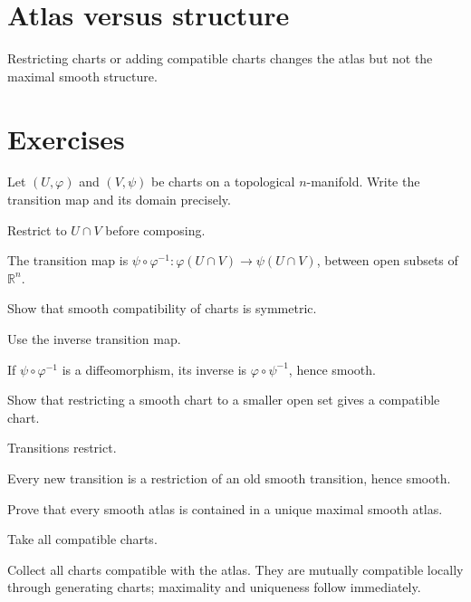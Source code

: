 \section{Atlas versus structure}
\begin{remark}\label{rem:vii02-generators}
Restricting charts or adding compatible charts changes the atlas but not the maximal smooth structure.
\end{remark}
\section{Exercises}
\begin{exercise}\label{exr:vii02-01}
Let \((U,\varphi)\) and \((V,\psi)\) be charts on a topological \(n\)-manifold. Write the transition map and its domain precisely.
\end{exercise}
\begin{hint}
Restrict to \(U\cap V\) before composing.
\end{hint}
\begin{solution}
The transition map is \(\psi\circ\varphi^{-1}:\varphi(U\cap V)\to\psi(U\cap V)\), between open subsets of \(\mathbb R^n\).
\end{solution}

\begin{exercise}\label{exr:vii02-02}
Show that smooth compatibility of charts is symmetric.
\end{exercise}
\begin{hint}
Use the inverse transition map.
\end{hint}
\begin{solution}
If \(\psi\circ\varphi^{-1}\) is a diffeomorphism, its inverse is \(\varphi\circ\psi^{-1}\), hence smooth.
\end{solution}

\begin{exercise}\label{exr:vii02-03}
Show that restricting a smooth chart to a smaller open set gives a compatible chart.
\end{exercise}
\begin{hint}
Transitions restrict.
\end{hint}
\begin{solution}
Every new transition is a restriction of an old smooth transition, hence smooth.
\end{solution}

\begin{exercise}\label{exr:vii02-04}
Prove that every smooth atlas is contained in a unique maximal smooth atlas.
\end{exercise}
\begin{hint}
Take all compatible charts.
\end{hint}
\begin{solution}
Collect all charts compatible with the atlas. They are mutually compatible locally through generating charts; maximality and uniqueness follow immediately.
\end{solution}

